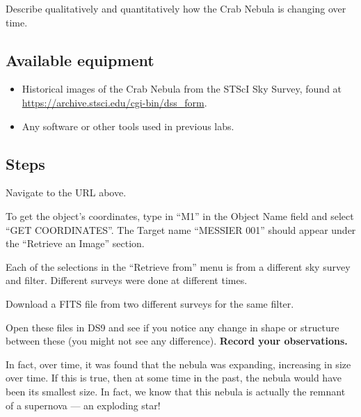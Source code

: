 Describe qualitatively and quantitatively how the Crab Nebula is changing over time.

\subsection{Available equipment}

\begin{itemize}
	
	\item Historical images of the Crab Nebula from the STScI Sky Survey, found at \url{https://archive.stsci.edu/cgi-bin/dss_form}.
	
	\item Any software or other tools used in previous labs.
\end{itemize}

\subsection{Steps}

\begin{steps}
	\item Navigate to the URL above.
	
	\item To get the object's coordinates, type in ``M1'' in the Object Name field and select ``GET COORDINATES''. The Target name ``MESSIER 001'' should appear under the ``Retrieve an Image'' section.
	
	\item Each of the selections in the ``Retrieve from'' menu is from a different sky survey and filter. Different surveys were done at different times.
	
	\item Download a FITS file from two different surveys for the same filter.
	
	\item Open these files in DS9 and see if you notice any change in shape or structure between these (you might not see any difference). \textbf{Record your observations.}
\end{steps}

In fact, over time, it was found that the nebula was expanding, increasing in size over time. If this is true, then at some time in the past, the nebula would have been its smallest size. In fact, we know that this nebula is actually the remnant of a supernova --- an exploding star!

